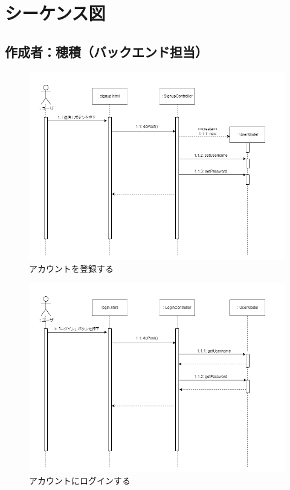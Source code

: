 \documentclass[dvipdfmx]{jsarticle}
\begin{document}
    \newpage

    \section*{シーケンス図}
    \subsection*{\rm{作成者：穂積（バックエンド担当）}}
    \begin{figure}[H]
        \begin{center}
            \caption*{アカウントを登録する}
            \includegraphics[scale=0.6,clip]{pictures/sequence-graph/signup.png}
        \end{center}
    \end{figure}

    \begin{figure}[H]
        \begin{center}
            \caption*{アカウントにログインする}
            \includegraphics[scale=0.6,clip]{pictures/sequence-graph/login.png}
        \end{center}
    \end{figure}
\end{document}

